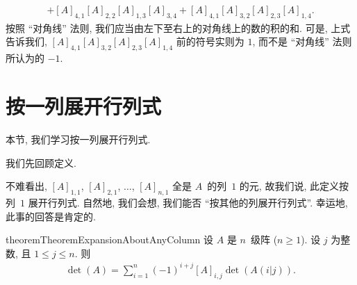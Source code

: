 \documentclass[%
    UTF8,%
    fontset=none,%
    punct=kaiming,%
    zihao=-4,%
    a4paper,%
    oneside,%
]{ctexbook}
\let\emph\relax
\renewcommand*{\leq}{\leqslant}
\renewcommand*{\geq}{\geqslant}
\begin{document}
\begin{example}
\begin{align*}
        + [A]_{4,1} [A]_{2,2} [A]_{1,3} [A]_{3,4}
        + [A]_{4,1} [A]_{3,2} [A]_{2,3} [A]_{1,4}.
    \end{align*}
    按照 ``对角线'' 法则,
    我们应当\emph{减}由左下至右上的对角线上的数的积的和.
    可是, 上式告诉我们,
    \([A]_{4,1} [A]_{3,2} [A]_{2,3} [A]_{1,4}\)
    前的符号实则为 \(1\),
    而不是 ``对角线'' 法则所认为的 \(-1\).
    \begin{figure}[h!]
        \centering
    \end{figure}
\end{example}

\section{按一列展开行列式}

本节, 我们学习按一列展开行列式.

我们先回顾定义.

\DefinitionDeterminants*

不难看出,
\([A]_{1,1}\), \([A]_{2,1}\), \(\dots\), \([A]_{n,1}\)
全是 \(A\)~的列~\(1\) 的元,
故我们说,
此定义按列~\(1\) 展开行列式.
自然地, 我们会想,
我们能否 ``按其他的列展开行列式''.
幸运地, 此事的回答是肯定的.

\begin{restatable}[]{theorem}{TheoremExpansionAboutAnyColumn}
    设 \(A\) 是 \(n\)~级阵 (\(n \geq 1\)).
    设 \(j\) 为整数, 且 \(1 \leq j \leq n\).
    则
    \begin{align*}
        \det {(A)} = \sum_{i = 1}^{n}
        {(-1)^{i+j} [A]_{i,j} \det {(A(i|j))}}.
    \end{align*}
\end{restatable}
\end{document}

